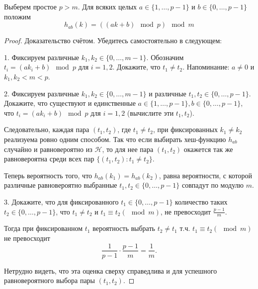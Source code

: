 Выберем простое $p > m$. Для всяких целых $a \in \{1, \ldots, p-1\}$ и $b \in \{0, \ldots, p-1\}$ положим $$h_{ab}(k) = ((ak+b)\mod p) \mod m$$
\begin{proof}
Доказательство счётом. Убедитесь самостоятельно в следующем:

1. Фиксируем различные $k_1, k_2 \in \{0, \ldots, m-1\}$. Обозначим $t_i = (ak_i + b)\mod p$ для $i = 1,2$. Докажите, что $t_1 \neq t_2$. Напоминание: $a\neq 0$ и $k_1, k_2 < m < p$.

2. Фиксируем различные $k_1, k_2 \in \{0, \ldots, m-1\}$ и различные $t_1, t_2 \in \{0, \ldots, p-1\}$. Докажите, что существуют и единственные $a \in \{1, \ldots, p-1\}, b \in \{0, \ldots, p-1\}$, что $t_i = (ak_i+b)\mod p$ для $i=1,2$ (вычислите эти $t_1, t_2$).

Следовательно, каждая пара $(t_1, t_2)$, где $t_1 \neq t_2$, при фиксированных $k_1 \neq k_2$ реализуема ровно одним способом. Так что если выбирать хеш-функцию $h_{ab}$ случайно и равновероятно из $\mathcal{H}$, то для нее пара $(t_1, t_2)$ окажется так же равновероятна среди всех пар $\{(t_1, t_2) \colon t_1 \neq t_2\}$. 

Теперь вероятность того, что $h_{ab}(k_1) = h_{ab}(k_2)$, равна вероятности, с которой различные равновероятно выбранные $t_1, t_2 \in \{0, \ldots, p-1\}$ совпадут по модулю $m$. 

3. Докажите, что для фиксированного $t_1 \in \{0, \ldots, p-1\}$ количество таких $t_2 \in \{0, \ldots, p-1\}$, что $t_1 \neq t_2$ и $t_1 \equiv t_2 (\mod m)$, не превосходит $\frac{p-1}{m}$.

Тогда при фиксированном $t_1$ вероятность выбрать $t_2 \neq t_1$ т.ч. $t_1\equiv t_2 (\mod m)$ не превосходит $$\frac{1}{p-1} \cdot \frac{p-1}{m} = \frac{1}{m}.$$

Нетрудно видеть, что эта оценка сверху справедлива и для успешного равновероятного выбора пары $(t_1, t_2)$. 
\end{proof}



